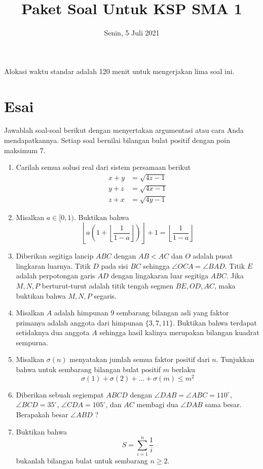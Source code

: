 \documentclass{article}
\title{Paket Soal Untuk KSP SMA 1}
\date{Senin, 5 Juli 2021}
\begin{document}
	\maketitle
	Alokasi waktu standar adalah 120 menit untuk mengerjakan lima soal ini.


\section{Esai}
Jawablah soal-soal berikut dengan menyertakan argumentasi atau cara Anda mendapatkannya. Setiap soal bernilai bilangan bulat positif dengan poin maksimum 7.

\begin{enumerate}[resume]
	\item Carilah semua solusi real dari sistem persamaan berikut
	\begin{align*}
		x+y &= \sqrt{4z-1} \\
		y+z &= \sqrt{4x-1} \\
		z+x &= \sqrt{4y-1}
	\end{align*}

	\item Misalkan $a \in [0,1)$. Buktikan bahwa
	$$ \left \lfloor a \left ( 1 + \left \lfloor \frac{1}{1-a} \right \rfloor \right) \right \rfloor + 1 = \left \lfloor \frac{1}{1-a} \right \rfloor$$
	
	\item Diberikan segitiga lancip $ABC$ dengan $AB < AC$ dan $O$ adalah pusat lingkaran luarnya. Titik $D$ pada sisi $BC$ sehingga $\angle OCA = \angle BAD$. Titik $E$ adalah perpotongan garis $AD$ dengan lingakaran luar segitiga $ABC$. Jika $M,N,P$ berturut-turut adalah titik tengah segmen $BE,OD,AC$, maka buktikan bahwa $M,N,P$ segaris.
	
	\item Misalkan $A$ adalah himpunan 9 sembarang bilangan asli yang faktor primanya adalah anggota dari himpunan $\{3,7,11\}$. Buktikan bahwa terdapat setidaknya dua anggota $A$ sehingga hasil kalinya merupakan bilangan kuadrat sempurna.
	
	\item Misalkan $\sigma (n)$ menyatakan jumlah semua faktor positif dari $n$. Tunjukkan bahwa untuk sembarang bilangan bulat positif $m$ berlaku $$\sigma(1)+\sigma(2)+\dots+\sigma(m) \le m^2$$
	
	\item Diberikan sebuah segiempat $ABCD$ dengan $\angle DAB = \angle ABC = 110^\circ$, $\angle BCD = 35^\circ$, $\angle CDA = 105^\circ$, dan $AC$ membagi dua $\angle DAB$ sama besar. Berapakah besar $\angle ABD$ ?
	
	\item Buktikan bahwa $$S=\sum_{i=1}^{n} \frac{1}{i}$$ bukanlah bilangan bulat untuk sembarang $n \ge 2$.
\end{enumerate}
\end{document}
